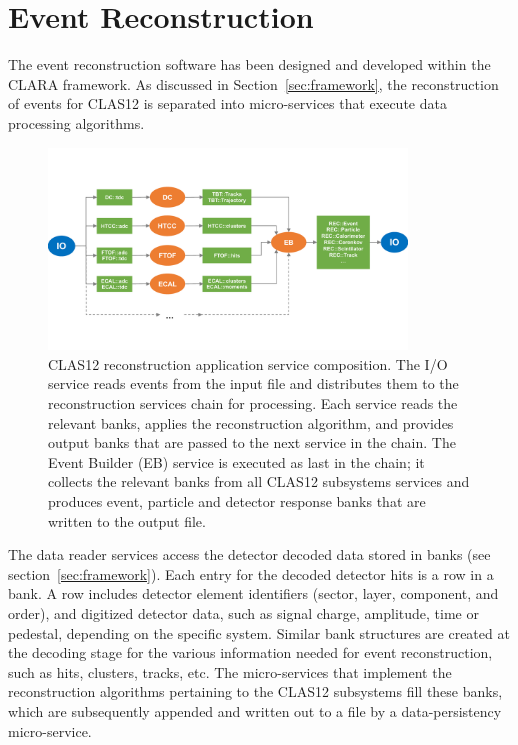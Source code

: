 \section{Event Reconstruction}
\label{sec:recon}

The event reconstruction software has been designed and developed within the CLARA framework. As discussed
in Section~\ref{sec:framework}, the reconstruction of events for CLAS12 is separated into micro-services that
execute data processing algorithms.

\begin{figure}
\centering
\includegraphics[width=0.85\textwidth]{pics/ServiceComposition.pdf}
\caption{CLAS12 reconstruction application service composition. The I/O service reads events from the input file and distributes them to the reconstruction services chain for processing. Each service reads the relevant banks, applies the reconstruction algorithm, and provides output banks that are passed to the next service in the chain. The Event Builder (EB) service is executed as last in the chain; it collects the relevant banks from all CLAS12 subsystems services and produces event, particle and detector response banks that are written to the output file.}
\label{fig:services}
\end{figure}

The data reader services access the detector decoded data stored in banks (see section~\ref{sec:framework}).
Each entry for the decoded detector hits is a row in a bank. A row includes detector element identifiers (sector,
layer, component, and order), and digitized detector data, such as signal charge, amplitude, time or pedestal,
depending on the specific system. Similar bank structures are created at the decoding stage for the various
information needed for event reconstruction, such as hits, clusters, tracks, etc. The micro-services that
implement the reconstruction algorithms pertaining to the CLAS12 subsystems fill these banks, which are
subsequently appended and written out to a file by a data-persistency micro-service.

